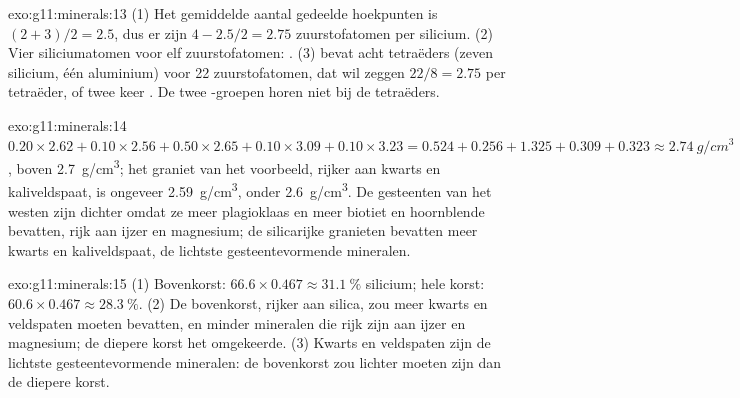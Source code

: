\begin{solution}{exo:g11:minerals:13}
(1) Het gemiddelde aantal gedeelde hoekpunten is $(2 + 3)/2 = 2.5$, dus er zijn
$4 - 2.5/2 = 2.75$ zuurstofatomen per silicium. (2) Vier siliciumatomen voor elf zuurstofatomen:
. (3)  bevat acht tetraëders (zeven silicium, één
aluminium) voor 22 zuurstofatomen, dat wil zeggen $22/8 = 2.75$ per tetraëder, of
twee keer . De twee -groepen horen niet bij de tetraëders.
\end{solution}

\begin{solution}{exo:g11:minerals:14}
$0.20 \times 2.62 + 0.10 \times 2.56 + 0.50 \times 2.65 + 0.10 \times 3.09 +
0.10 \times 3.23 = 0.524 + 0.256 + 1.325 + 0.309 + 0.323 \approx
\qty{2.74}{g/cm^3}$, boven \qty{2.7}{g/cm^3}; het graniet van het voorbeeld,
rijker aan kwarts en kaliveldspaat, is ongeveer \qty{2.59}{g/cm^3}, onder
\qty{2.6}{g/cm^3}. De gesteenten van het westen zijn dichter omdat ze meer
plagioklaas en meer biotiet en hoornblende bevatten, rijk aan ijzer en magnesium; de
silicarijke granieten bevatten meer kwarts en kaliveldspaat, de lichtste
gesteentevormende mineralen.
\end{solution}

\begin{solution}{exo:g11:minerals:15}
(1) Bovenkorst: $66.6 \times 0.467 \approx \qty{31.1}{\percent}$ silicium;
hele korst: $60.6 \times 0.467 \approx \qty{28.3}{\percent}$. (2) De bovenkorst,
rijker aan silica, zou meer kwarts en veldspaten moeten bevatten, en minder
mineralen die rijk zijn aan ijzer en magnesium; de diepere korst het omgekeerde. (3) Kwarts
en veldspaten zijn de lichtste gesteentevormende mineralen: de bovenkorst zou
lichter moeten zijn dan de diepere korst.
\end{solution}


